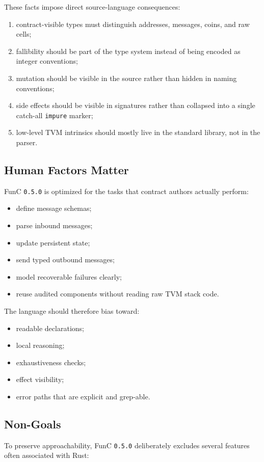 \documentclass[12pt,oneside]{article}
\begin{document}
These facts impose direct source-language consequences:

\begin{enumerate}
\item contract-visible types must distinguish addresses, messages, coins, and
raw cells;
\item fallibility should be part of the type system instead of being encoded as
integer conventions;
\item mutation should be visible in the source rather than hidden in naming
conventions;
\item side effects should be visible in signatures rather than collapsed into a
single catch-all \verb|impure| marker;
\item low-level TVM intrinsics should mostly live in the standard library, not
in the parser.
\end{enumerate}

\subsection{Human Factors Matter}
FunC \verb|0.5.0| is optimized for the tasks that contract authors actually
perform:

\begin{itemize}
\item define message schemas;
\item parse inbound messages;
\item update persistent state;
\item send typed outbound messages;
\item model recoverable failures clearly;
\item reuse audited components without reading raw TVM stack code.
\end{itemize}

The language should therefore bias toward:

\begin{itemize}
\item readable declarations;
\item local reasoning;
\item exhaustiveness checks;
\item effect visibility;
\item error paths that are explicit and grep-able.
\end{itemize}

\subsection{Non-Goals}
To preserve approachability, FunC \verb|0.5.0| deliberately excludes several
features often associated with Rust:
\end{document}
